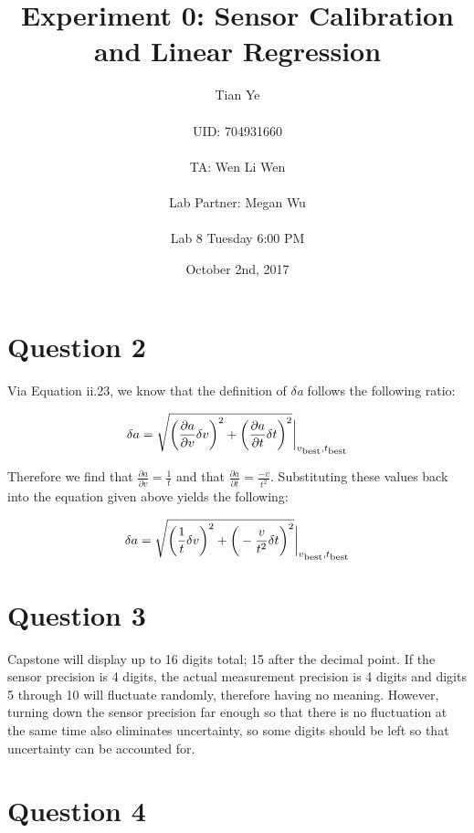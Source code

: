 \documentclass[titlepage]{article}
\begin{document}
\title{Experiment 0: Sensor Calibration and Linear Regression}
\author{Tian Ye \\ \\ UID: 704931660 \\ \\ TA: Wen Li Wen \\ \\ Lab Partner: Megan Wu \\ \\ Lab 8 Tuesday 6:00 PM}
\date{October 2nd, 2017}

\maketitle

\section*{Question 2}

Via Equation ii.23, we know that the definition of $\delta$\textit{a} follows the following ratio:

\[
\delta a = \sqrt{\bigg (\frac{\partial a}{\partial v}\delta v\bigg )^2 + \bigg (\frac{\partial a}{\partial t} \delta t\bigg )^2} \bigg |_{v\textsubscript{best}, t\textsubscript{best}}
\]

Therefore we find that $\frac{\partial a}{\partial v} = \frac{1}{t}$ and that  $\frac{\partial a}{\partial t} = \frac{-v}{t^2}$. Substituting these values back into the equation given above yields the following:

\[
\delta a = \sqrt{\bigg (\frac{1}{t}\delta v\bigg )^2 + \bigg (-\frac{v}{t^2}\delta t\bigg )^2} \bigg |_{v\textsubscript{best}, t\textsubscript{best}}
\]

\section*{Question 3}

Capstone will display up to 16 digits total; 15 after the decimal point. If the sensor precision is 4 digits, the actual measurement precision is 4 digits and digits 5 through 10 will fluctuate randomly, therefore having no meaning. However, turning down the sensor precision far enough so that there is no fluctuation at the same time also eliminates uncertainty, so some digits should be left so that uncertainty can be accounted for.

\section*{Question 4}
\end{document}
